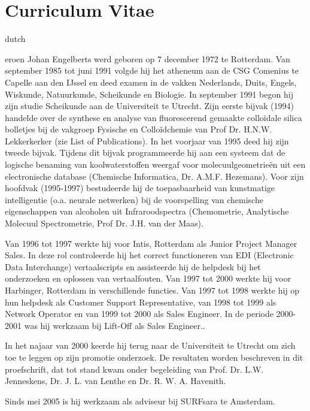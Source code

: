 \chapter*{Curriculum Vitae}
\fancyhead[RO]{\thepage}
\fancyhead[LE]{\thepage}
\begin{otherlanguage*}{dutch}
\label{cv}

\lettrine{}{}eroen Johan Engelberts werd geboren op 7 december 1972 te Rotterdam. Van september 1985 tot juni 1991 volgde hij het atheneum aan de CSG Comenius te Capelle aan den IJssel en deed examen in de vakken Nederlands, Duits, Engels, Wiskunde, Natuurkunde, Scheikunde en Biologie. In september 1991 begon hij zijn studie Scheikunde aan de Universiteit te Utrecht. Zijn eerste bijvak (1994) handelde over de synthese en analyse van fluorescerend gemaakte collo\"idale silica bolletjes bij de vakgroep Fysische en Collo\"idchemie van Prof Dr. H.N.W. Lekkerkerker (zie List of Publications). In het voorjaar van 1995 deed hij zijn tweede bijvak. Tijdens dit bijvak programmeerde hij aan een systeem dat de logische benaming van koolwaterstoffen weergaf voor molecuulgeometrie\"en uit een electronische database (Chemische Informatica, Dr. A.M.F. Hezemans). Voor zijn hoofdvak (1995-1997) bestudeerde hij de toepasbaarheid van kunstmatige intelligentie (o.a. neurale netwerken) bij de voorspelling van chemische eigenschappen van alcoholen uit Infraroodspectra (Chemometrie, Analytische Molecuul Spectrometrie, Prof Dr. J.H. van der Maas). 

 Van 1996 tot 1997 werkte hij voor Intis, Rotterdam als Junior Project Manager Sales. In deze rol controleerde hij het correct functioneren van EDI (Electronic Data Interchange) vertaalscripts en assisteerde hij de helpdesk bij het onderzoeken en oplossen van vertaalfouten.  Van 1997 tot 2000 werkte hij voor Harbinger, Rotterdam in verschillende functies. Van 1997 tot 1998 werkte hij op hun helpdesk als Customer Support Representative, van 1998 tot 1999 als Network Operator en van 1999 tot 2000 als Sales Engineer.  In de periode 2000-2001 was hij werkzaam bij Lift-Off als Sales Engineer..

In het najaar van 2000 keerde hij terug naar de Universiteit te Utrecht om zich toe te leggen op zijn promotie onderzoek. De resultaten worden beschreven in dit proefschrift, dat tot stand kwam onder begeleiding van  Prof. Dr. L.W.  Jenneskens, Dr. J. L. van Lenthe en Dr. R. W. A. Havenith.

Sinds mei 2005 is hij werkzaam als adviseur bij SURFsara te Amsterdam.
\end{otherlanguage*}
